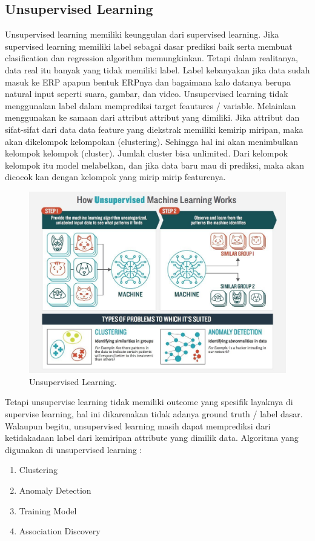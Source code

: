 \subsection{Unsupervised Learning}
\hfill\break
Unsupervised learning memiliki keunggulan dari supervised learning. Jika supervised learning memiliki label sebagai dasar prediksi baik serta membuat clasification dan regression algorithm memungkinkan. Tetapi dalam realitanya, data real itu banyak yang tidak memiliki label. Label kebanyakan jika data sudah masuk ke ERP apapun bentuk ERPnya dan bagaimana kalo datanya berupa natural input seperti suara, gambar, dan video. Unsupervised learning tidak menggunakan label dalam memprediksi target feautures / variable. Melainkan menggunakan ke samaan dari attribut attribut yang dimiliki. Jika attribut dan sifat-sifat dari data data feature yang diekstrak memiliki kemirip miripan, maka akan dikelompok kelompokan (clustering). Sehingga hal ini akan menimbulkan kelompok kelompok (cluster). Jumlah cluster bisa unlimited. Dari kelompok kelompok itu model melabelkan, dan jika data baru mau di prediksi, maka akan dicocok kan dengan kelompok yang mirip mirip featurenya.
\begin{figure}[H]
	\includegraphics[width=1\textwidth]{figures/chapter1/unsupervisedlearning.jpg}
	\centering
	\caption{Unsupervised Learning.}
\end{figure}
\noindent
Tetapi unsupervise learning tidak memiliki outcome yang spesifik layaknya di supervise learning, hal ini dikarenakan tidak adanya ground truth / label dasar. Walaupun begitu, unsupervised learning masih dapat memprediksi dari ketidakadaan label dari kemiripan attribute yang dimilik data.
\noindent
Algoritma yang digunakan di unsupervised learning :
\begin{enumerate}
	\item Clustering
    \item Anomaly Detection
    \item Training Model
    \item Association Discovery
\end{enumerate}
